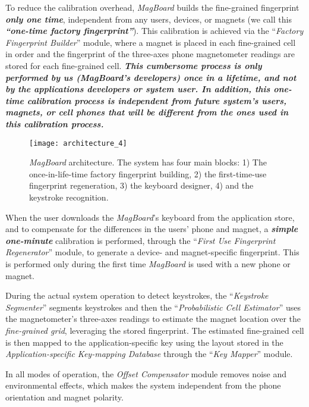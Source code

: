 \documentclass[conference]{IEEEtran}
\def \sys {\textit{MagBoard}}
\begin{document}
To reduce the calibration overhead, \sys{} builds the fine-grained fingerprint \textbf{\emph{only one time}}, independent from any users, devices, or magnets (we call this \textbf{\emph{``one-time factory fingerprint''}}). This calibration is achieved via the 
``\emph{Factory Fingerprint Builder}'' module, where a magnet is placed in each fine-grained cell in order and the fingerprint of the three-axes phone magnetometer readings are stored for each fine-grained cell. \textbf{\emph{This cumbersome process is only performed by us (\sys{}'s developers) once in a lifetime, and not by the applications developers or system user. In addition, this one-time calibration process is independent from future system's users, magnets, or cell phones that will be different from the ones used in this calibration process.}}

\begin{figure}[!t]
\centering
\texttt{[image: architecture\_4]}
\caption{\sys{} architecture. The system has four main blocks: 1) The once-in-life-time factory fingerprint building, 2) the first-time-use fingerprint regeneration, 3) the keyboard designer, 4) and the keystroke recognition.}
\label{fig:architecture}
\vspace{-0.2in}
\end{figure}

When the user downloads the \sys{}'s keyboard from the application store, and to compensate for the differences in the users' phone and magnet, a \textbf{\emph{simple one-minute}} calibration is performed, through the ``\textit{First Use Fingerprint Regenerator}'' module, to generate a device- and magnet-specific fingerprint. This is performed only during the first time \sys{} is used with a new phone or magnet.

During the actual system operation to detect keystrokes, the ``\textit{Keystroke Segmenter}'' segments keystrokes and then the ``\textit{Probabilistic Cell Estimator}'' uses the magnetometer's three-axes readings to estimate the magnet location over the \emph{fine-grained grid}, leveraging the stored fingerprint.  The estimated fine-grained cell is then mapped to the application-specific key using the layout stored in the \emph{Application-specific Key-mapping Database} through the ``\emph{Key Mapper}'' module. 

In all modes of operation, the \textit{Offset Compensator} module removes noise and environmental effects, which makes the system independent from the phone orientation and magnet polarity.
\end{document}
